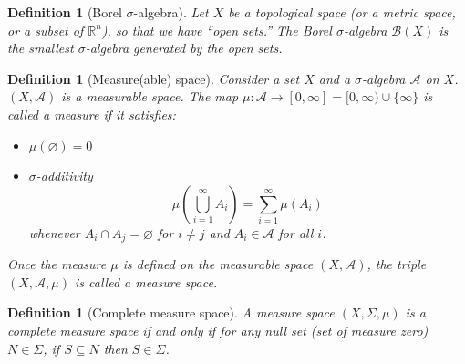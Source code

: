 \documentclass[11pt, letter]{book}
\newtheorem{definition}[theorem]{Definition}
\newcommand{\lp}{\left(}
\newcommand{\rp}{\right)}
\begin{document}
\begin{definition}[Borel $\sigma$-algebra]
Let $X$ be a topological space (or a metric space, or a subset of $\mathbb{R}^n$), so that we have ``open sets.'' The Borel $\sigma$-algebra $\mathcal{B}(X)$ is the smallest $\sigma$-algebra generated by the open sets.
\end{definition}
\begin{definition}[Measure(able) space]
Consider a set $X$ and a $\sigma$-algebra $\mathcal{A}$ on $X$. $(X, \mathcal{A})$ is a measurable space. The map $\mu : \mathcal{A} \to [0,\infty] = [0,\infty) \cup \{ \infty\}$ is called a measure if it satisfies:
\begin{itemize}
    \item $\mu(\varnothing) = 0$
    \item $\sigma$-additivity
    \begin{equation*}
        \mu \lp \bigcup^\infty_{i=1} A_i \rp = \sum^\infty_{i=1} \mu(A_i)
    \end{equation*}
    whenever $A_i \cap A_j = \varnothing$ for $i \neq j$ and $A_i \in \mathcal{A}$ for all $i$. 
\end{itemize}
Once the measure $\mu$ is defined on the measurable space $(X,\mathcal{A})$, the triple $(X,\mathcal{A},\mu)$ is called a measure space.  
\end{definition}
\begin{definition}[Complete measure space]
A measure space $(X,\Sigma, \mu)$ is a complete measure space if and only if for any null set (set of measure zero) $N\in \Sigma$, if $S\subseteq N$ then $S\in \Sigma$.
\end{definition}
\end{document}
